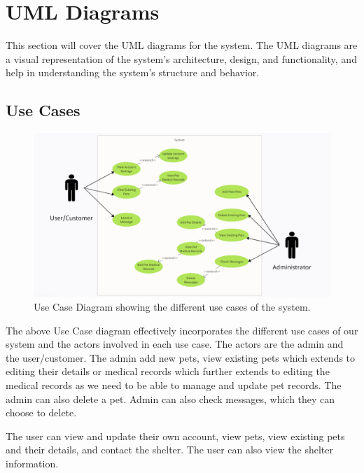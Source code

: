 \section{UML Diagrams}
This section will cover the UML diagrams for the system. The UML diagrams are a visual representation of the system's architecture, design, and functionality, and help in understanding the system's structure and behavior. 

\subsection{Use Cases}
\begin{figure}[htbp]
    \centering
    \includegraphics[width=\textwidth]{images/Use Case Diagram.png}
    \caption{Use Case Diagram showing the different use cases of the system.}
\end{figure}

The above Use Case diagram effectively incorporates the different use cases of our system and the actors involved in each use case. The actors are the admin and the user/customer. The admin add new pets, view existing pets which extends to editing their details or medical records which further extends to editing the medical records as we need to be able to manage and update pet records. The admin can also delete a pet. Admin can also check messages, which they can choose to delete. 

The user can view and update their own account, view pets, view existing pets and their details, and contact the shelter. The user can also view the shelter information.

\newpage
